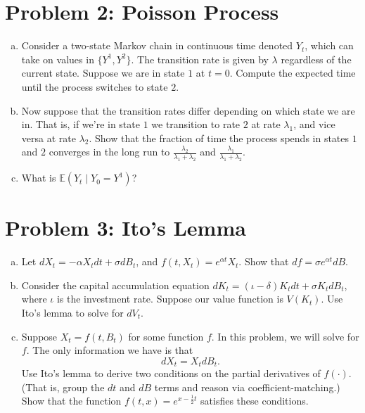 \documentclass[11pt]{extarticle}
\theoremstyle{plain}
\theoremstyle{definition}
\begin{document}
\vspace{5mm}
\section*{Problem 2: Poisson Process}

\begin{enumerate}[(a)]
\item Consider a two-state Markov chain in continuous time denoted $Y_t$, which can take on values in $\{Y^1, Y^2\}$. The transition rate is given by $\lambda$ regardless of the current state. Suppose we are in state $1$ at $t = 0$. Compute the expected time until the process switches to state $2$. 

\item Now suppose that the transition rates differ depending on which state we are in. That is, if we're in state $1$ we transition to rate $2$ at rate $\lambda_1$, and vice versa at rate $\lambda_2$. Show that the fraction of time the process spends in states $1$ and $2$ converges in the long run to $\frac{\lambda_2}{\lambda_1 + \lambda_2}$ and $\frac{\lambda_1}{\lambda_1 + \lambda_2}$. 

\item What is $\mathbb E (Y_t \mid Y_0 = Y^1)$?

\end{enumerate}


\vspace{5mm}
\section*{Problem 3: Ito's Lemma}

\begin{enumerate}[(a)]
\item Let $dX_t = - \alpha X_t dt + \sigma dB_t$, and $f(t, X_t) = e^{\alpha t} X_t$. Show that $df = \sigma e^{\alpha t} d B$. 

\item Consider the capital accumulation equation $dK_t = (\iota - \delta) K_t dt + \sigma K_t dB_t$, where $\iota$ is the investment rate. Suppose our value function is $V(K_t)$. Use Ito's lemma to solve for $dV_t$.   

\item Suppose $X_t = f(t, B_t)$ for some function $f$. In this problem, we will solve for $f$. The only information we have is that 
\begin{equation*}
	dX_t = X_t dB_t.
\end{equation*}
Use Ito's lemma to derive two conditions on the partial derivatives of $f(\cdot)$. (That is, group the $dt$ and $dB$ terms and reason via coefficient-matching.) Show that the function $f(t, x) = e^{x - \frac{1}{2}t}$ satisfies these conditions. 
\end{enumerate}
\end{document}
